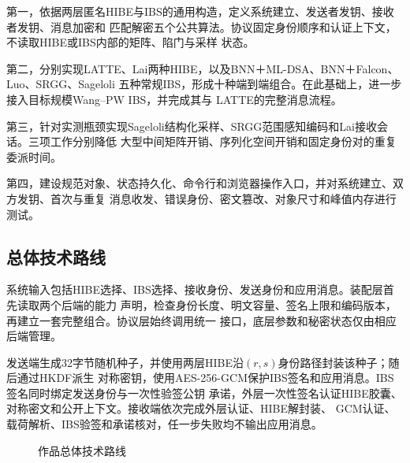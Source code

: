 第一，依据两层匿名HIBE与IBS的通用构造，定义系统建立、发送者发钥、接收者发钥、消息加密和
匹配解密五个公共算法。协议固定身份顺序和认证上下文，不读取HIBE或IBS内部的矩阵、陷门与采样
状态。

第二，分别实现LATTE、Lai两种HIBE，以及BNN＋ML-DSA、BNN＋Falcon、Luo、SRGG、Sageloli
五种常规IBS，形成十种端到端组合。在此基础上，进一步接入目标规模Wang--PW IBS，并完成其与
LATTE的完整消息流程。

第三，针对实测瓶颈实现Sageloli结构化采样、SRGG范围感知编码和Lai接收会话。三项工作分别降低
大型中间矩阵开销、序列化空间开销和固定身份对的重复委派时间。

第四，建设规范对象、状态持久化、命令行和浏览器操作入口，并对系统建立、双方发钥、首次与重复
消息收发、错误身份、密文篡改、对象尺寸和峰值内存进行测试。

\subsection{总体技术路线}

系统输入包括HIBE选择、IBS选择、接收身份、发送身份和应用消息。装配层首先读取两个后端的能力
声明，检查身份长度、明文容量、签名上限和编码版本，再建立一套完整组合。协议层始终调用统一
接口，底层参数和秘密状态仅由相应后端管理。

发送端生成32字节随机种子，并使用两层HIBE沿$(r,s)$身份路径封装该种子；随后通过HKDF派生
对称密钥，使用AES-256-GCM保护IBS签名和应用消息。IBS签名同时绑定发送身份与一次性验签公钥
承诺，外层一次性签名认证HIBE胶囊、对称密文和公开上下文。接收端依次完成外层认证、HIBE解封装、
GCM认证、载荷解析、IBS验签和承诺核对，任一步失败均不输出应用消息。

\begin{figure}[H]
\centering
{}
\caption{作品总体技术路线}
\label{fig:work-overview}
\end{figure}

